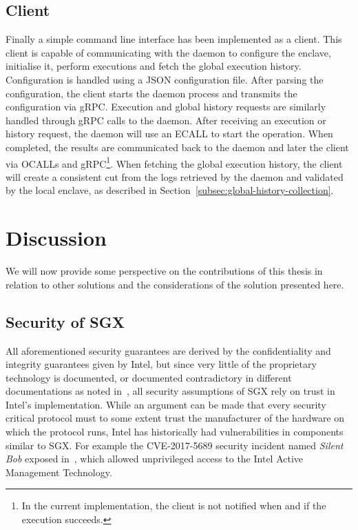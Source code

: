 \documentclass{article}
\begin{document}
	\subsection{Client}

	Finally a simple command line interface has been implemented as a client.
	This client is capable of communicating with the daemon to configure the enclave, initialise it, perform executions and fetch the global execution history.
	Configuration is handled using a JSON configuration file.
	After parsing the configuration, the client starts the daemon process and transmits the configuration via gRPC.
	Execution and global history requests are similarly handled through gRPC calls to the daemon.
	After receiving an execution or history request, the daemon will use an ECALL to start the operation.
	When completed, the results are communicated back to the daemon and later the client via OCALLs and gRPC\footnote{In the current implementation, the client is not notified when and if the execution succeeds.}.
	When fetching the global execution history, the client will create a consistent cut from the logs retrieved by the daemon and validated by the local enclave, as described in Section~\ref{subsec:global-history-collection}.

	\section{Discussion}

	We will now provide some perspective on the contributions of this thesis in relation to other solutions and the considerations of the solution presented here.

    \subsection{Security of SGX}

	All aforementioned security guarantees are derived by the confidentiality and integrity guarantees given by Intel, but since very little of the proprietary technology is documented, or documented contradictory in different documentations as noted in~\cite{costan_intel_2016}, all security assumptions of SGX rely on trust in Intel's implementation.
    While an argument can be made that every security critical protocol must to some extent trust the manufacturer of the hardware on which the protocol runs, Intel has historically had vulnerabilities in components similar to SGX.
    For example the CVE-2017-5689 security incident named \textit{Silent Bob} exposed in~\cite{silent_bob}, which allowed unprivileged access to the Intel Active Management Technology.
\end{document}
